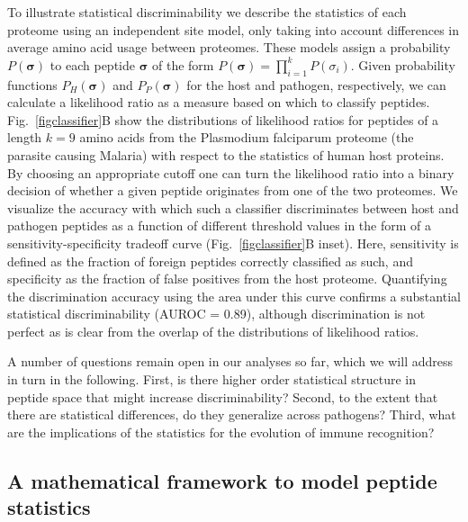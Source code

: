 \documentclass[superscriptaddress,twocolumn,pre]{revtex4}
\newcommand{\B}{\boldsymbol}
\newcommand{\<}{\langle}
\renewcommand{\>}{\rangle}
\begin{document}
To illustrate statistical discriminability we describe the statistics of each proteome using an independent site model, only taking into account differences in average amino acid usage between proteomes. These models assign a probability $P(\B \sigma)$ to each peptide $\B \sigma$ of the form $P(\B \sigma) = \prod_{i=1}^k P(\sigma_i)$. Given probability functions $P_H(\B \sigma)$ and $P_P(\B \sigma)$ for the host and pathogen, respectively, we can calculate a likelihood ratio as a measure based on which to classify peptides. Fig.~\ref{figclassifier}B show the distributions of likelihood ratios for peptides of a length $k=9$ amino acids from the Plasmodium falciparum proteome (the parasite causing Malaria) with respect to the statistics of human host proteins. By choosing an appropriate cutoff one can turn the likelihood ratio into a binary decision of whether a given peptide originates from one of the two proteomes. We visualize the accuracy with which such a classifier discriminates between host and pathogen peptides as a function of different threshold values in the form of a sensitivity-specificity tradeoff curve (Fig.~\ref{figclassifier}B inset). Here, sensitivity is defined as the fraction of foreign peptides correctly classified as such, and specificity as the fraction of false positives from the host proteome. Quantifying the discrimination accuracy using the area under this curve confirms a substantial statistical discriminability (AUROC = 0.89), although discrimination is not perfect as is clear from the overlap of the distributions of likelihood ratios.




A number of questions remain open in our analyses so far, which we will address in turn in the following. First, is there higher order statistical structure in peptide space that might increase discriminability? Second, to the extent that there are statistical differences, do they generalize across pathogens? Third, what are the implications of the statistics for the evolution of immune recognition?


\subsection{A mathematical framework to model peptide statistics} 
\end{document}
